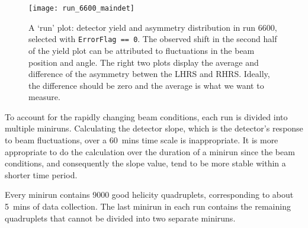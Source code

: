 \begin{figure}[!h]
    \centering
    \texttt{[image: run\_6600\_maindet]}
    \caption[A `run' plot: detector yield and asymmetry distribution in run 6600]
    {A `run' plot: detector yield and asymmetry distribution in run 6600, 
    selected with \texttt{ErrorFlag == 0}. The observed shift in the second half of the 
    yield plot can be attributed to fluctuations in the beam position and angle. 
    The right two plots display the average and difference of the asymmetry betwen 
    the LHRS and RHRS. 
    Ideally, the difference should be zero and the average is what we want to measure.
    }
\end{figure}

To account for the rapidly changing beam conditions, each run is divided into
multiple miniruns. Calculating the detector slope, which is the detector's 
response to beam fluctuations, over a 60~mins time scale is inappropriate.
It is more appropriate to do the calculation over the duration of a minirun
since the beam conditions, and consequently the slope value, tend to be
more stable within a shorter time period.  

Every minirun contains 9000 good helicity quadruplets, corresponding to about 5~mins
of data collection. The last minirun in each run contains the remaining
quadruplets that cannot be divided into two separate miniruns. 


